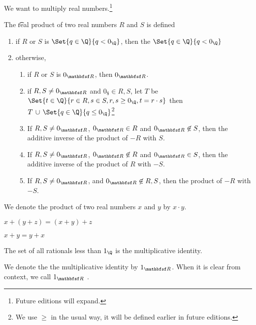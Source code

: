 

We want to multiply real numbers.\footnote{Future editions will expand.}


The \t{real product} of two real numbers $R$ and $S$ is defined
\begin{enumerate}
  \item if $R$ or $S$ is $\Set{q \in \Q}{q < 0_{\Q}}$, then the $\Set{q \in \Q}{q < 0_{\Q}}$
  \item otherwise,
  \begin{enumerate}
    \item if $R$ or $S$ is $0_{\R}$, then $0_{\R}$.
    \item if $R,S \neq 0_{\R}$ and $0_{\$} \in R, S$, let $T$ be $\Set{t \in \Q}{r \in R, s \in S, r, s \geq 0_{\Q}, t = r\cdot s}$ then $T \union \Set{q \in \Q}{q \leq 0_{\Q}}$\footnote{We use $\geq$ in the usual way, it will be defined earlier in future editions.}
    \item If $R, S \neq 0_{\R}$, $0_{\R} \in R$ and $0_{\R} \not\in S$, then the additive inverse of the product of $-R$ with $S$.
    \item If $R, S \neq 0_{\R}$, $0_{\R} \not\in R$ and $0_{\R} \in S$, then the additive inverse of the product of $R$ with $-S$.
    \item If $R, S \neq 0_{\R}$, and $0_{\R} \not\in R,S$, then the product of $-R$ with $-S$.
  \end{enumerate}
\end{enumerate}


We denote the product of two real numbers $x$ and $y$ by $x \cdot y$.


\begin{proposition}[Associative]
  $x + (y + z) = (x + y) + z$
\end{proposition}

\begin{proposition}[Commutative]
  $x + y = y + x$
\end{proposition}

\begin{proposition}[Identity]
  The set of all rationals less than $1_{\Q}$ is the multiplicative identity.
\end{proposition}

We denote the the multiplicative identity by $1_{\R}$.
When it is clear from context, we call $1_{\R}$ .

